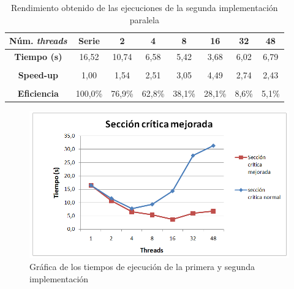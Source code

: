 \begin{table}[H]
	\small
	\centering
	\captionsetup{justification=centering}
	\begin{tabular}{cccccccc}
		\hline
		\multicolumn{1}{|c|}{{\bf N\'{u}m. \textit{threads}}} & \multicolumn{1}{c|}{{\bf Serie}} & \multicolumn{1}{c|}{{\bf 2}} & \multicolumn{1}{c|}{{\bf 4}} & \multicolumn{1}{c|}{{\bf 8}} & \multicolumn{1}{c|}{{\bf 16}} & \multicolumn{1}{c|}{{\bf 32}} & \multicolumn{1}{c|}{{\bf 48}} \\ \hline
		\multicolumn{1}{|c|}{{\bf Tiempo (s)}}           & \multicolumn{1}{c|}{16,52}      & \multicolumn{1}{c|}{10,74}  & \multicolumn{1}{c|}{6,58}   & \multicolumn{1}{c|}{5,42}   & \multicolumn{1}{c|}{3,68}    & \multicolumn{1}{c|}{6,02}    & \multicolumn{1}{c|}{6,79}    \\ \hline
		\multicolumn{1}{l}{}                         & \multicolumn{1}{l}{}             & \multicolumn{1}{l}{}         & \multicolumn{1}{l}{}         & \multicolumn{1}{l}{}         & \multicolumn{1}{l}{}          & \multicolumn{1}{l}{}          & \multicolumn{1}{l}{}          \\ \hline
		\multicolumn{1}{|c|}{{\bf Speed-up}}         & \multicolumn{1}{c|}{1,00}        & \multicolumn{1}{c|}{1,54}    & \multicolumn{1}{c|}{2,51}    & \multicolumn{1}{c|}{3,05}    & \multicolumn{1}{c|}{4,49}     & \multicolumn{1}{c|}{2,74}     & \multicolumn{1}{c|}{2,43}     \\ \hline
		{\bf }                                       &                                  &                              &                              &                              &                               &                               &                               \\ \hline
		\multicolumn{1}{|c|}{{\bf Eficiencia}}       & \multicolumn{1}{c|}{100,0\%}    & \multicolumn{1}{c|}{76,9\%} & \multicolumn{1}{c|}{62,8\%} & \multicolumn{1}{c|}{38,1\%} & \multicolumn{1}{c|}{28,1\%}  & \multicolumn{1}{c|}{8,6\%}   & \multicolumn{1}{c|}{5,1\%}   \\ \hline
	\end{tabular}
	\caption{Rendimiento obtenido de las ejecuciones de la segunda implementaci\'{o}n paralela}
\end{table}




\begin{figure}[H]
	\captionsetup{justification=centering}
	\centering
	\includegraphics[width=.8\textwidth]{./imagenes/grafico2Imple}
	\caption{Gr\'{a}fica de los tiempos de ejecuci\'{o}n de la primera y segunda implementaci\'{o}n}	
	\label{grafico2Imple}
\end{figure}

